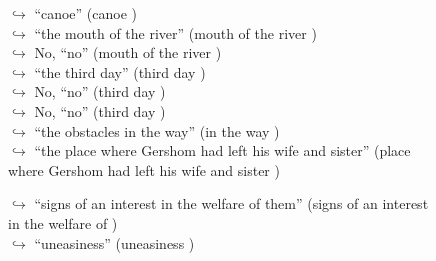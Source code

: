 \documentclass[11pt,a4paper, onecolumn]{article}
\begin{document}
\begin{figure}[t] \small \begin{tcolorbox}[boxsep=0pt,left=5pt,right=0pt,top=2pt,colback = yellow!5] \begin{dialogue}
 \small 
\colorbox{pink!25}{$\hookrightarrow$}
{ ``canoe'' (canoe ) }
\\
\colorbox{pink!25}{$\hookrightarrow$}
{ ``the mouth of the river'' (mouth of the river ) }
\\
\colorbox{pink!25}{$\hookrightarrow$}
\colorbox{red!25}{No,}
{ ``no'' (mouth of the river ) }
\\
\colorbox{pink!25}{$\hookrightarrow$}
{ ``the third day'' (third day ) }
\\
\colorbox{pink!25}{$\hookrightarrow$}
\colorbox{red!25}{No,}
{ ``no'' (third day ) }
\\
\colorbox{pink!25}{$\hookrightarrow$}
\colorbox{red!25}{No,}
{ ``no'' (third day ) }
\\
\colorbox{pink!25}{$\hookrightarrow$}
{ ``the obstacles in the way'' (in the way ) }
\\
\colorbox{pink!25}{$\hookrightarrow$}
{ ``the place where Gershom had left his wife and sister'' (place where Gershom had left his wife and sister ) }
 \end{dialogue}\end{tcolorbox}\end{figure}\begin{figure}[t] \small \begin{tcolorbox}[boxsep=0pt,left=5pt,right=0pt,top=2pt,colback = yellow!5] \begin{dialogue}
 \small 
\colorbox{pink!25}{$\hookrightarrow$}
{ ``signs of an interest in the welfare of them'' (signs of an interest in the welfare of ) }
\\
\colorbox{pink!25}{$\hookrightarrow$}
{ ``uneasiness'' (uneasiness ) }
\\

\end{dialogue}
\end{tcolorbox}
\end{figure}
\end{document}
